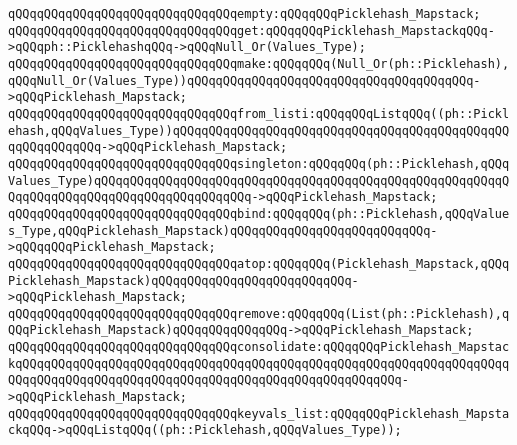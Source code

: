 \verb|qQQqqQQqqQQqqQQqqQQqqQQqqQQqqQQqempty:qQQqqQQqPicklehash_Mapstack;|\newline
\newline
\verb|qQQqqQQqqQQqqQQqqQQqqQQqqQQqqQQqget:qQQqqQQqPicklehash_MapstackqQQq->qQQqph::PicklehashqQQq->qQQqNull_Or(Values_Type);|\newline
\newline
\newline
\verb|qQQqqQQqqQQqqQQqqQQqqQQqqQQqqQQqmake:qQQqqQQq(Null_Or(ph::Picklehash),qQQqNull_Or(Values_Type))qQQqqQQqqQQqqQQqqQQqqQQqqQQqqQQqqQQqqQQq->qQQqPicklehash_Mapstack;|\newline
\newline
\verb|qQQqqQQqqQQqqQQqqQQqqQQqqQQqqQQqfrom_listi:qQQqqQQqListqQQq((ph::Picklehash,qQQqValues_Type))qQQqqQQqqQQqqQQqqQQqqQQqqQQqqQQqqQQqqQQqqQQqqQQqqQQqqQQqqQQq->qQQqPicklehash_Mapstack;|\newline
\newline
\verb|qQQqqQQqqQQqqQQqqQQqqQQqqQQqqQQqsingleton:qQQqqQQq(ph::Picklehash,qQQqValues_Type)qQQqqQQqqQQqqQQqqQQqqQQqqQQqqQQqqQQqqQQqqQQqqQQqqQQqqQQqqQQqqQQqqQQqqQQqqQQqqQQqqQQqqQQqqQQq->qQQqPicklehash_Mapstack;|\newline
\newline
\verb|qQQqqQQqqQQqqQQqqQQqqQQqqQQqqQQqbind:qQQqqQQq(ph::Picklehash,qQQqValues_Type,qQQqPicklehash_Mapstack)qQQqqQQqqQQqqQQqqQQqqQQqqQQq->qQQqqQQqPicklehash_Mapstack;|\newline
\newline
\verb|qQQqqQQqqQQqqQQqqQQqqQQqqQQqqQQqatop:qQQqqQQq(Picklehash_Mapstack,qQQqPicklehash_Mapstack)qQQqqQQqqQQqqQQqqQQqqQQqqQQq->qQQqPicklehash_Mapstack;|\newline
\newline
\verb|qQQqqQQqqQQqqQQqqQQqqQQqqQQqqQQqremove:qQQqqQQq(List(ph::Picklehash),qQQqPicklehash_Mapstack)qQQqqQQqqQQqqQQq->qQQqPicklehash_Mapstack;|\newline
\newline
\verb|qQQqqQQqqQQqqQQqqQQqqQQqqQQqqQQqconsolidate:qQQqqQQqPicklehash_MapstackqQQqqQQqqQQqqQQqqQQqqQQqqQQqqQQqqQQqqQQqqQQqqQQqqQQqqQQqqQQqqQQqqQQqqQQqqQQqqQQqqQQqqQQqqQQqqQQqqQQqqQQqqQQqqQQqqQQqqQQqqQQq->qQQqPicklehash_Mapstack;|\newline
\newline
\newline
\newline
\verb|qQQqqQQqqQQqqQQqqQQqqQQqqQQqqQQqkeyvals_list:qQQqqQQqPicklehash_MapstackqQQq->qQQqListqQQq((ph::Picklehash,qQQqValues_Type));|\newline
